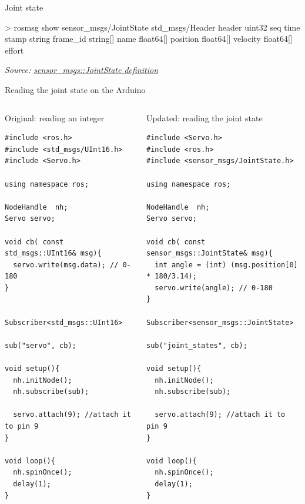 \documentclass[compress]{beamer}
\newcommand{\source}[2]{{\tiny\it Source: \href{#1}{#2}}}
\begin{document}
\begin{frame}[fragile]{Joint state}
\begin{shcode}
> rosmsg show sensor_msgs/JointState 
std_msgs/Header header
  uint32 seq
  time stamp
  string frame_id
string[] name
float64[] position
float64[] velocity
float64[] effort
\end{shcode}

\source{http://docs.ros.org/api/sensor_msgs/html/msg/JointState.html}{sensor\_msgs::JointState definition}
\end{frame}


\begin{frame}[fragile]{Reading the joint state on the Arduino}
\begin{columns}
    \begin{column}{0.5\linewidth}

\small Original: reading an integer
\begin{verbatim}
#include <ros.h>
#include <std_msgs/UInt16.h>
#include <Servo.h> 

using namespace ros;

NodeHandle  nh;
Servo servo;

void cb( const std_msgs::UInt16& msg){
  servo.write(msg.data); // 0-180
}


Subscriber<std_msgs::UInt16> 
                        sub("servo", cb);

void setup(){
  nh.initNode();
  nh.subscribe(sub);

  servo.attach(9); //attach it to pin 9
}

void loop(){
  nh.spinOnce();
  delay(1);
}
\end{verbatim}
    \end{column}
    \begin{column}{0.5\linewidth}

\small Updated: reading the joint state

\begin{verbatim}
#include <Servo.h> 
#include <ros.h>
#include <sensor_msgs/JointState.h>

using namespace ros;

NodeHandle  nh;
Servo servo;

void cb( const sensor_msgs::JointState& msg){
  int angle = (int) (msg.position[0] * 180/3.14);
  servo.write(angle); // 0-180
}

Subscriber<sensor_msgs::JointState>
                        sub("joint_states", cb);

void setup(){
  nh.initNode();
  nh.subscribe(sub);
  
  servo.attach(9); //attach it to pin 9
}

void loop(){
  nh.spinOnce();
  delay(1);
}
\end{verbatim}



    \end{column}
\end{columns}
\end{frame}
\end{document}
